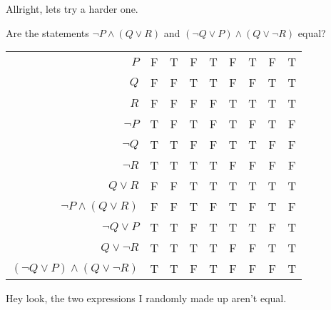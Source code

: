 Allright, lets try a harder one.

\begin{boxexample}{}{}
	Are the statements $\neg P \land (Q \lor R)$ and $(\neg Q \lor P) \land (Q \lor \neg R)$ equal?

	\medskip
	\begin{tabular}{r|c c c c c c c c}
		\hline
		\rowcolor{skyblue}
		$P$ & F & T & F & T & F & T & F & T\\
		\rowcolor{skyblue}
		$Q$ & F & F & T & T & F & F & T & T\\
		\rowcolor{skyblue}
		$R$ & F & F & F & F & T & T & T & T\\
		$\neg P$ & T & F & T & F & T & F & T & F\\
		$\neg Q$ & T & T & F & F & T & T & F & F\\
		$\neg R$ & T & T & T & T & F & F & F & F\\
		$Q \lor R$ & F & F & T & T & T & T & T & T\\
		\rowcolor{skyblue}
		$\neg P \land (Q \lor R)$ & F & F & T & F & T & F & T & F\\
		$\neg Q \lor P$ & T & T & F & T & T & T & F & T\\
		$Q \lor \neg R$ & T & T & T & T & F & F & T & T\\
		\rowcolor{skyblue}
		$(\neg Q \lor P) \land (Q \lor \neg R)$ & T & T & F & T & F & F & F & T\\
		\hline
	\end{tabular}
	\medskip
\end{boxexample}

Hey look, the two expressions I randomly  made up aren't equal.
